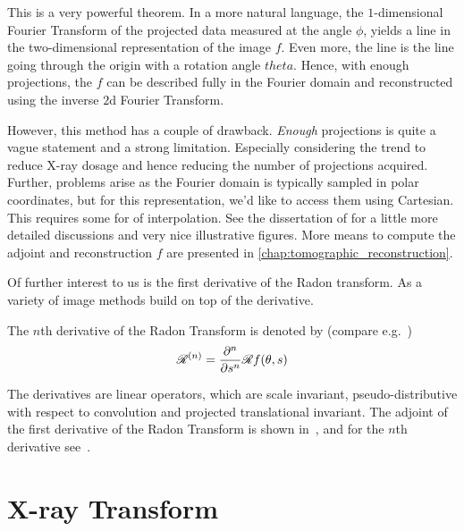 This is a very powerful theorem. In a more natural language, the \(1\)-dimensional Fourier Transform
of the projected data measured at the angle \(\phi\), yields a line in the two-dimensional
representation of the image \(f\). Even more, the line is the line going through the origin with a
rotation angle \(theta\). Hence, with enough projections, the \(f\) can be described fully in the
Fourier domain and reconstructed using the inverse \(2\)d Fourier Transform.


However, this method has a couple of drawback. \textit{Enough} projections is quite a vague
statement and a strong limitation. Especially considering the trend to reduce X-ray dosage and hence
reducing the number of projections acquired. Further, problems arise as the Fourier domain is
typically sampled in polar coordinates, but for this representation, we'd like to access them using
Cartesian. This requires some for of interpolation. See the dissertation of
\citeauthor{vogel_tomographic_nodate}\cite[Chapter~4.1.2]{vogel_tomographic_nodate} for a little more
detailed discussions and very nice illustrative figures. More means to compute the adjoint and
reconstruction \(f\) are presented in \autoref{chap:tomographic_reconstruction}.

Of further interest to us is the first derivative of the Radon transform. As a variety of image
methods build on top of the derivative.

\begin{definition}
	The \(n\)th derivative of the Radon Transform is denoted by (compare
	e.g.\ \cite{nilchian_differential_2012,nilchian_fast_2013})
	\[ \mathscr{R}^{(n)} = \frac{\partial^n}{\partial s^n} \mathscr{R} f(\theta, s)\]
\end{definition}

The derivatives are linear operators, which are scale invariant, pseudo-distributive with respect to
convolution and projected translational invariant. The adjoint of the first derivative of the Radon
Transform is shown in~\cite{nilchian_differential_2012}, and for the \(n\)th derivative
see~\cite{nilchian_fast_2013}.

\section{X-ray Transform}\label{sec:xray_transform}


